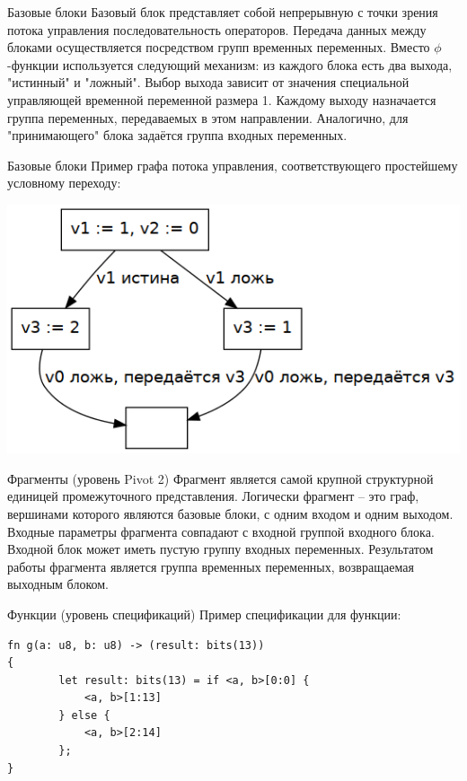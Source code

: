 \documentclass[presentation]{beamer}
\begin{document}
\begin{frame}[label={sec:org1b52cee}]{Базовые блоки}
Базовый блок представляет собой непрерывную с точки зрения потока управления последовательность
операторов. Передача данных между блоками осуществляется посредством групп временных переменных.
Вместо \(\phi\)-функции используется следующий механизм: из каждого блока есть два выхода, "истинный"
и "ложный". Выбор выхода зависит от значения специальной управляющей временной переменной
размера 1. Каждому выходу назначается группа переменных, передаваемых в этом направлении.
Аналогично, для "принимающего" блока задаётся группа входных переменных.
\end{frame}
\begin{frame}[label={sec:org67a68fe}]{Базовые блоки}
Пример графа потока управления, соответствующего простейшему условному переходу:
\begin{center}
\includegraphics[width=.9\linewidth]{cfg.png}
\end{center}
\end{frame}
\begin{frame}[label={sec:orge13aaed}]{Фрагменты (уровень Pivot 2)}
Фрагмент является самой крупной структурной единицей промежуточного представления. Логически
фрагмент -- это граф, вершинами которого являются базовые блоки, с одним входом и одним выходом.
Входные параметры фрагмента совпадают с входной группой входного блока. Входной блок может
иметь пустую группу входных переменных. Результатом работы фрагмента является
группа временных переменных, возвращаемая выходным блоком.
\end{frame}
\begin{frame}[label={sec:orgd7569ed},fragile]{Функции (уровень спецификаций)}
 Пример спецификации для функции:
\begin{verbatim}
fn g(a: u8, b: u8) -> (result: bits(13))
{
        let result: bits(13) = if <a, b>[0:0] {
            <a, b>[1:13]
        } else {
            <a, b>[2:14]
        };
}
\end{verbatim}
\end{frame}
\end{document}
